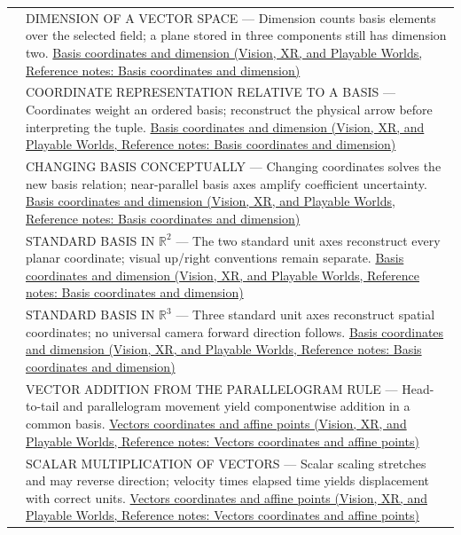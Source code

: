 {\begin{longtable}[]{@{}
  >{\raggedright\arraybackslash}p{}
  >{\raggedright\arraybackslash}p{}@{}}
513 & DIMENSION OF A VECTOR SPACE --- Dimension counts basis elements over the selected field; a plane stored in three components still has dimension two. \href{../07-Vision-XR-and-Playable-Worlds/main.pdf\#nameddest=appendix-ce0341f7ea0d}{Basis coordinates and dimension (Vision, XR, and Playable Worlds, Reference notes: Basis coordinates and dimension)} \\
514 & COORDINATE REPRESENTATION RELATIVE TO A BASIS --- Coordinates weight an ordered basis; reconstruct the physical arrow before interpreting the tuple. \href{../07-Vision-XR-and-Playable-Worlds/main.pdf\#nameddest=appendix-ce0341f7ea0d}{Basis coordinates and dimension (Vision, XR, and Playable Worlds, Reference notes: Basis coordinates and dimension)} \\
515 & CHANGING BASIS CONCEPTUALLY --- Changing coordinates solves the new basis relation; near-parallel basis axes amplify coefficient uncertainty. \href{../07-Vision-XR-and-Playable-Worlds/main.pdf\#nameddest=appendix-ce0341f7ea0d}{Basis coordinates and dimension (Vision, XR, and Playable Worlds, Reference notes: Basis coordinates and dimension)} \\
516 & STANDARD BASIS IN \(\mathbb R^2\) --- The two standard unit axes reconstruct every planar coordinate; visual up/right conventions remain separate. \href{../07-Vision-XR-and-Playable-Worlds/main.pdf\#nameddest=appendix-ce0341f7ea0d}{Basis coordinates and dimension (Vision, XR, and Playable Worlds, Reference notes: Basis coordinates and dimension)} \\
517 & STANDARD BASIS IN \(\mathbb R^3\) --- Three standard unit axes reconstruct spatial coordinates; no universal camera forward direction follows. \href{../07-Vision-XR-and-Playable-Worlds/main.pdf\#nameddest=appendix-ce0341f7ea0d}{Basis coordinates and dimension (Vision, XR, and Playable Worlds, Reference notes: Basis coordinates and dimension)} \\
518 & VECTOR ADDITION FROM THE PARALLELOGRAM RULE --- Head-to-tail and parallelogram movement yield componentwise addition in a common basis. \href{../07-Vision-XR-and-Playable-Worlds/main.pdf\#nameddest=appendix-0659864c0aa3}{Vectors coordinates and affine points (Vision, XR, and Playable Worlds, Reference notes: Vectors coordinates and affine points)} \\
519 & SCALAR MULTIPLICATION OF VECTORS --- Scalar scaling stretches and may reverse direction; velocity times elapsed time yields displacement with correct units. \href{../07-Vision-XR-and-Playable-Worlds/main.pdf\#nameddest=appendix-0659864c0aa3}{Vectors coordinates and affine points (Vision, XR, and Playable Worlds, Reference notes: Vectors coordinates and affine points)} \\

\end{longtable}}
